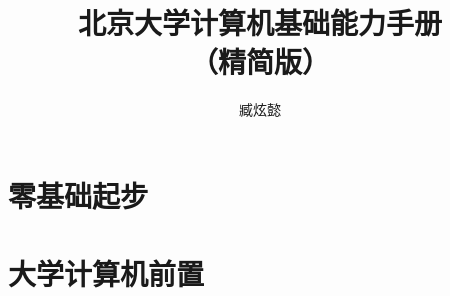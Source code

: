 \documentclass[openany]{ctexbook}
\title{\Huge\textbf{北京大学计算机基础能力手册 \\ （精简版）}}
\author{臧炫懿}
\begin{document}
\maketitle

\frontmatter





\mainmatter

\tableofcontents

\part{零基础起步}









\part{大学计算机前置}

% 

% 

% 




% 

% 

% 

% 



% 

% 

% 

% 

% 

\backmatter


\end{document}
